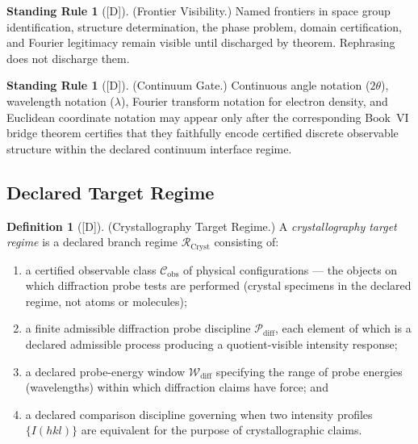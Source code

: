 \documentclass[12pt,oneside]{amsbook}
\theoremstyle{plain}
\theoremstyle{definition}
\newtheorem{definition}[theorem]{Definition}
\newtheorem{standingrule}[theorem]{Standing Rule}
\theoremstyle{remark}
\newcommand{\status}[1]{\textup{[#1]}}
\begin{document}
\begin{standingrule}[\status{D}]\label{sr:cryst-frontier-visibility}
\textup{(Frontier Visibility.)}
Named frontiers in space group identification, structure
determination, the phase problem, domain certification, and
Fourier legitimacy remain visible until discharged by theorem.
Rephrasing does not discharge them.
\end{standingrule}

\begin{standingrule}[\status{D}]\label{sr:cryst-continuum-gate}
\textup{(Continuum Gate.)}
Continuous angle notation ($2\theta$), wavelength notation
($\lambda$), Fourier transform notation for electron density, and
Euclidean coordinate notation may appear only after the
corresponding Book~VI bridge theorem certifies that they faithfully
encode certified discrete observable structure within the declared
continuum interface regime.
\end{standingrule}

\subsection{Declared Target Regime}

\begin{definition}[\status{D}]\label{def:cryst-target-regime}
\textup{(Crystallography Target Regime.)}
A \emph{crystallography target regime} is a declared branch regime
$\mathcal{R}_{\mathrm{Cryst}}$ consisting of:
\begin{enumerate}[label=\textup{(\arabic*)}]
  \item a certified observable class $\mathcal{C}_{\mathrm{obs}}$
    of physical configurations --- the objects on which diffraction
    probe tests are performed (crystal specimens in the declared
    regime, not atoms or molecules);
  \item a finite admissible diffraction probe discipline
    $\mathcal{P}_{\mathrm{diff}}$, each element of which is a
    declared admissible process producing a
    quotient-visible intensity response;
  \item a declared probe-energy window $\mathcal{W}_{\mathrm{diff}}$
    specifying the range of probe energies (wavelengths) within which
    diffraction claims have force; and
  \item a declared comparison discipline governing when two
    intensity profiles $\{I(hkl)\}$ are equivalent for the purpose
    of crystallographic claims.
\end{enumerate}
\end{definition}
\end{document}
